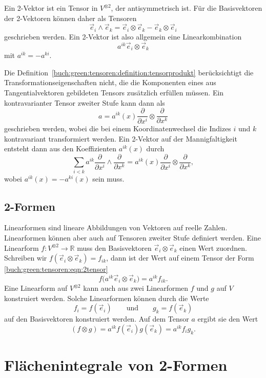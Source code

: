 Ein 2-Vektor ist ein Tensor in $V^{\otimes 2}$, der antisymmetrisch ist.
Für die Basisvektoren der 2-Vektoren können daher als Tensoren
\[
\vec{e}_i\wedge\vec{e}_k
=
\vec{e}_i\otimes\vec{e}_k
-
\vec{e}_k\otimes\vec{e}_i
\]
geschrieben werden.
Ein 2-Vektor ist also allgemein eine Linearkombination
\begin{equation}
a^{ik}\vec{e}_i\otimes\vec{e}_k
\label{buch:green:tensoren:eqn:2tensor}
\end{equation}
mit $a^{ik}=-a^{ki}$.

Die Definition~\ref{buch:green:tensoren:definition:tensorprodukt}
berücksichtigt die Transformationseigenschaften nicht,
die die Komponenten eines aus Tangentialvektoren gebildeten
Tensors zusätzlich erfüllen müssen.
Ein kontravarianter Tensor zweiter Stufe kann dann als
\[
a
=
a^{ik}(x) \frac{\partial}{\partial x^i}\otimes\frac{\partial}{\partial x^k}
\]
geschrieben werden, wobei die bei einem Koordinatenwechsel die
Indizes $i$ und $k$ kontravariant transformiert werden.
Ein 2-Vektor auf der Mannigfaltigkeit entsteht dann aus den Koeffizienten
$a^{ik}(x)$ durch
\[
\sum_{i<k}
a^{ik}
\frac{\partial}{\partial x^i}
\wedge
\frac{\partial}{\partial x^k}
=
a^{ik}(x)
\frac{\partial}{\partial x^i}
\otimes
\frac{\partial}{\partial x^k},
\]
wobei $a^{ik}(x)=-a^{ki}(x)$ sein muss.

%
%
\subsection{2-Formen}
Linearformen sind lineare Abbildungen von Vektoren auf reelle Zahlen.
Linearformen können aber auch auf Tensoren zweiter Stufe definiert werden.
Eine Linearform $f\colon V^{\otimes 2}\to\mathbb{R}$ muss den Basisvektoren
$\vec{e}_i\otimes\vec{e}_k$ einen Wert zuordnen.
Schreiben wir $f(\vec{e}_i\otimes\vec{e}_k)=f_{ik}$, dann ist der Wert
auf einem Tensor der Form
\eqref{buch:green:tensoren:eqn:2tensor}
\[
f\bigl(
a^{ik}\vec{e}_i\otimes \vec{e}_k
\bigr)
=
a^{ik}
f_{ik}.
\]
Eine Linearform auf $V^{\otimes 2}$ kann auch aus zwei Linearformen
$f$ und $g$ auf $V$ konstruiert werden.
Solche Linearformen können durch die Werte
\[
f_i = f(\vec{e}_i) 
\qquad\text{und}\qquad
g_k = f(\vec{e}_k)
\]
auf den Basisvektoren konstruiert werden.
Auf dem Tensor $a$ ergibt sie den Wert
\[
(f\otimes g)
=
a^{ik}f(\vec{e}_i)g(\vec{e}_k)
=
a^{ik}f_ig_k.
\]


%
%
\section{Flächenintegrale von 2-Formen
\label{buch:green:section:integral}}

